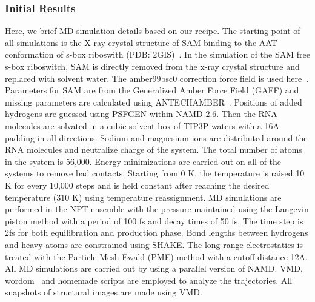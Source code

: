 \documentclass[a4paper,10pt]{article}
\begin{document}
\subsubsection*{Initial Results}

Here, we brief MD simulation details based on our recipe.  The starting point of all simulations is the X-ray crystal structure of SAM binding to the AAT conformation 
of s-box riboswith (PDB: 2GIS)~\cite{montange}. In the simulation of the SAM free s-box riboswitch, SAM 
is directly removed from the x-ray crystal structure and replaced with solvent water. The amber99bsc0
correction force field is used here~\cite{alberto}. Parameters for SAM are from the Generalized Amber 
Force Field (GAFF) and missing parameters are calculated using ANTECHAMBER~\cite{wang}. Positions 
of added hydrogens are guessed using PSFGEN within NAMD 2.6. Then the RNA molecules are solvated 
in a cubic solvent box of TIP3P waters with a 16A padding in all directions. Sodium and magnesium ions 
are distributed around the RNA molecules and neutralize charge of the 
system. The total number of atoms in the system is 56,000. Energy minimizations are carried out on all of the systems to remove bad contacts. Starting from 
0 K, the temperature is raised 10 K for every 10,000 steps and is held constant after reaching the desired 
temperature (310 K) using temperature reassignment. MD simulations are performed in the NPT ensemble 
with the pressure maintained using the Langevin piston method with a period of 100 fs and decay times of 
50 fs. The time step is 2fs for both equilibration and production phase. Bond lengths between hydrogens 
and heavy atoms are constrained using SHAKE. The long-range electrostatics is treated with the Particle 
Mesh Ewald (PME) method with a cutoff distance 12A.  All MD simulations are carried out by using a parallel version of NAMD.  VMD, wordom~\cite{moe} and homemade scripts are employed to analyze the trajectories. All snapshots 
of structural images are made using VMD.

\end{document}
